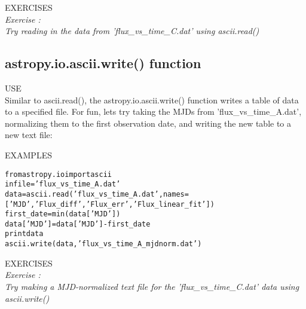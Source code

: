 {\color{blue} {\sf\small EXERCISES}} \\
{\it Exercise  :  \\
Try reading in the data from 'flux_vs_time_C.dat' using ascii.read()}

\subsection{ {\sf astropy.io.ascii.write() } function}
{\color{blue} {\sf\small USE}} \\
Similar to {\sf\small ascii.read()}, the {\sf\small astropy.io.ascii.write()} function writes a table of data 
to a specified file.  For fun, lets try taking the MJDs from 'flux_vs_time_A.dat', 
normalizing them to the first observation date, and writing the new table to a new text file:

{\color{blue} {\sf\small EXAMPLES}} 
\begin{alltt}
\pytab from astropy.io import ascii
\pytab infile = 'flux_vs_time_A.dat'
\pytab data = ascii.read('flux_vs_time_A.dat', names=['MJD', 'Flux_diff', 'Flux_err', 'Flux_linear_fit'])
\pytab first_date = min(data['MJD'])
\pytab data['MJD'] = data['MJD'] - first_date
\pytab print data
\pytab ascii.write(data, 'flux_vs_time_A_mjdnorm.dat')
\end{alltt}

{\color{blue} {\sf\small EXERCISES}} \\
{\it Exercise  :  \\
Try making a MJD-normalized text file for the 'flux_vs_time_C.dat' data using ascii.write()}